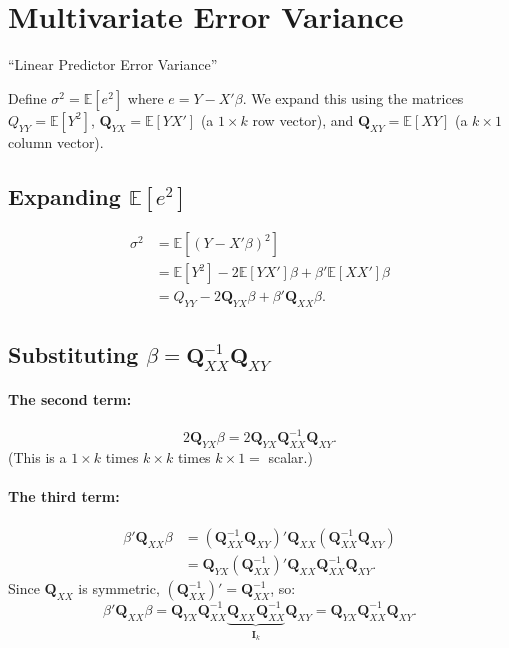 \documentclass[12pt]{article}
\newcommand{\E}{\mathbb{E}}
\newcommand{\bfQ}{\mathbf{Q}}
\theoremstyle{definition}
\begin{document}
\section{Multivariate Error Variance}
\label{sec:errorvar}

\begin{tcolorbox}[colback=blue!5, colframe=blue!50, title=Slide Reference]
``Linear Predictor Error Variance''
\end{tcolorbox}

Define $\sigma^2 = \E[e^2]$ where $e = Y - X'\beta$. We expand this using the matrices $Q_{YY} = \E[Y^2]$, $\bfQ_{YX} = \E[YX']$ (a $1 \times k$ row vector), and $\bfQ_{XY} = \E[XY]$ (a $k \times 1$ column vector).

\subsection{Expanding $\E[e^2]$}

\begin{align*}
\sigma^2 &= \E[(Y - X'\beta)^2]\\
&= \E[Y^2] - 2\E[YX']\beta + \beta'\E[XX']\beta\\
&= Q_{YY} - 2\bfQ_{YX}\beta + \beta'\bfQ_{XX}\beta.
\end{align*}

\subsection{Substituting $\beta = \bfQ_{XX}^{-1}\bfQ_{XY}$}

\paragraph{The second term:}
\[
2\bfQ_{YX}\beta = 2\bfQ_{YX}\bfQ_{XX}^{-1}\bfQ_{XY}.
\]
(This is a $1 \times k$ times $k \times k$ times $k \times 1 = $ scalar.)

\paragraph{The third term:}
\begin{align*}
\beta'\bfQ_{XX}\beta &= (\bfQ_{XX}^{-1}\bfQ_{XY})'\bfQ_{XX}(\bfQ_{XX}^{-1}\bfQ_{XY})\\
&= \bfQ_{YX}(\bfQ_{XX}^{-1})'\bfQ_{XX}\bfQ_{XX}^{-1}\bfQ_{XY}.
\end{align*}
Since $\bfQ_{XX}$ is symmetric, $(\bfQ_{XX}^{-1})' = \bfQ_{XX}^{-1}$, so:
\[
\beta'\bfQ_{XX}\beta = \bfQ_{YX}\bfQ_{XX}^{-1}\underbrace{\bfQ_{XX}\bfQ_{XX}^{-1}}_{\mathbf{I}_k}\bfQ_{XY} = \bfQ_{YX}\bfQ_{XX}^{-1}\bfQ_{XY}.
\]
\end{document}
